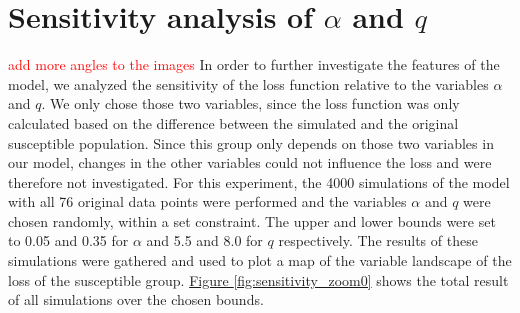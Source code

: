 
\section{Sensitivity analysis of $\alpha$ and $q$}
\textcolor{red}{add more angles to the images}
In order to further investigate the features of the model, we analyzed the sensitivity of the loss function relative to
the variables $\alpha$ and $q$. We only chose those two variables, since the loss function was only calculated based
on the difference between the simulated and the original susceptible population. Since this group only depends on those
two variables in our model, changes in the other variables could not influence the loss and were therefore not investigated.
For this experiment, the 4000 simulations of the model with all 76 original data points were performed and the variables
$\alpha$ and $q$ were chosen randomly, within a set constraint. The upper and lower bounds were set to 0.05 and 0.35 for 
$\alpha$ and 5.5 and 8.0 for $q$ respectively. The results of these simulations were gathered and used to plot a map
of the variable landscape of the loss of the susceptible group.
\hyperref[fig:sensitivity_zoom0]{Figure \ref*{fig:sensitivity_zoom0}} shows the total result of all simulations over the
chosen bounds.

